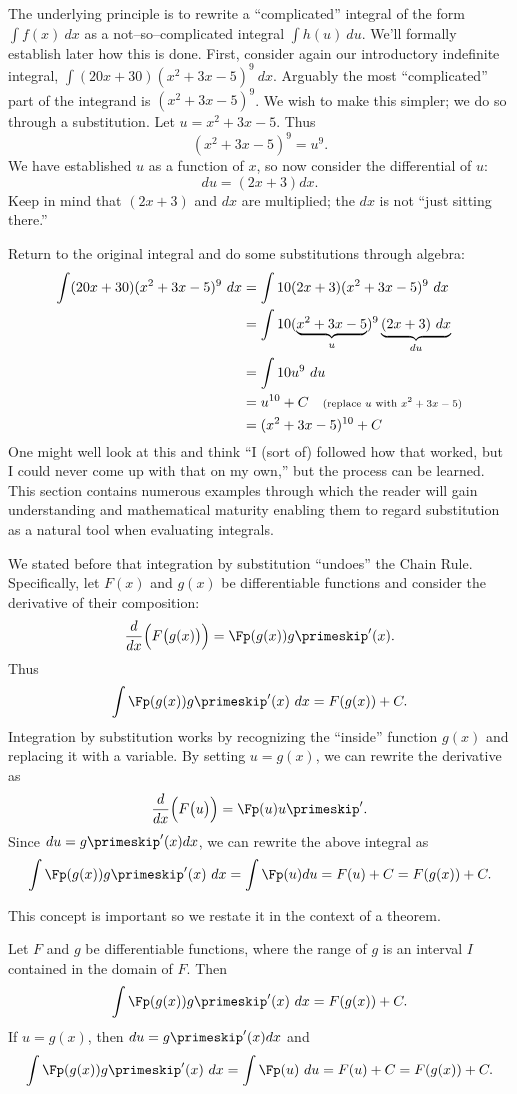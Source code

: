 The underlying principle is to rewrite a ``complicated'' integral of the form $\int f(x)\ dx$ as a not--so--complicated integral $\int h(u)\ du$. We'll formally establish later how this is done. First, consider again our introductory indefinite integral, $\int (20x+30)(x^2+3x-5)^9\ dx$. Arguably the most ``complicated'' part of the integrand is $(x^2+3x-5)^9$. We wish to make this simpler; we do so through a substitution. Let $u=x^2+3x-5$. Thus $$(x^2+3x-5)^9 = u^9.$$
We have established $u$ as a function of $x$, so now consider the differential of $u$: $$du = (2x+3)dx.$$ Keep in mind that $(2x+3)$ and $dx$ are multiplied; the $dx$ is not ``just sitting there.''

Return to the original integral and do some substitutions through algebra:
\begin{align*}
	\int (20x+30)(x^2+3x-5)^9\ dx 	&=	\int 10(2x+3)(x^2+3x-5)^9\ dx \\
									&=\int 10(\underbrace{x^2+3x-5}_u)^9\underbrace{(2x+3)\ dx}_{du} \\
									&=\int 10u^9\ du \\
									&= u^{10} + C \quad \text{\scriptsize (replace $u$ with $x^2+3x-5$)}\\
									&= (x^2+3x-5)^{10} +C
\end{align*}
One might well look at this and think ``I (sort of) followed how that worked, but I could never come up with that on my own,'' but the process can be learned. This section contains numerous examples through which the reader will gain understanding and mathematical maturity enabling them to regard substitution as a natural tool when evaluating integrals.

We stated before that integration by substitution ``undoes'' the Chain Rule. Specifically, let $F(x)$ and $g(x)$ be differentiable functions and consider the derivative of their composition: 
	$$\frac{d}{dx}\Big(F\big(g(x)\big)\Big) = \Fp(g(x))g\primeskip'(x).$$ Thus 
	$$\int \Fp(g(x))g\primeskip'(x)\ dx = F(g(x)) + C.$$
Integration by substitution works by recognizing the ``inside'' function $g(x)$ and replacing it with a variable. By setting $u=g(x)$, we can rewrite the derivative as
	$$\frac{d}{dx}\Big(F\big(u\big)\Big) = \Fp(u)u\primeskip'.$$
Since $du = g\primeskip'(x)dx$, we can rewrite the above integral as
	$$\int \Fp(g(x))g\primeskip'(x)\ dx = \int \Fp(u) du = F(u)+C = F(g(x))+ C.$$
	
This concept is important so we restate it in the context of a theorem.

{Let $F$ and $g$ be differentiable functions, where the range of $g$ is an interval $I$ contained in the domain of $F$. Then 
	$$\int \Fp(g(x))g\primeskip'(x)\ dx = F(g(x)) + C.$$
If $u = g(x)$, then $du = g\primeskip'(x)dx$ and 
	$$\int \Fp(g(x))g\primeskip'(x)\ dx = \int \Fp(u)\ du = F(u)+C = F(g(x))+C.$$
}

